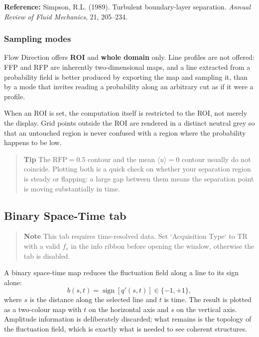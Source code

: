 \noindent\textbf{Reference:} Simpson, R.L. (1989). Turbulent boundary-layer separation. \textit{Annual Review of Fluid Mechanics}, 21, 205--234.

\subsubsection*{Sampling modes}

Flow Direction offers \textbf{ROI} and \textbf{whole domain} only. Line profiles are not offered: FFP and RFP are inherently two-dimensional maps, and a line extracted from a probability field is better produced by exporting the map and sampling it, than by a mode that invites reading a probability along an arbitrary cut as if it were a profile.

When an ROI is set, the computation itself is restricted to the ROI, not merely the display. Grid points outside the ROI are rendered in a distinct neutral grey so that an untouched region is never confused with a region where the probability happens to be low.

\begin{quote}
\textbf{Tip}
The $\mathrm{RFP} = 0.5$ contour and the mean $\langle u \rangle = 0$ contour usually do not coincide. Plotting both is a quick check on whether your separation region is steady or flapping: a large gap between them means the separation point is moving substantially in time.
\end{quote}

\subsection{Binary Space-Time tab}

\begin{quote}
\textbf{Note}
This tab requires time-resolved data. Set `Acquisition Type` to TR with a valid $f_s$ in the info ribbon before opening the window, otherwise the tab is disabled.
\end{quote}

A binary space-time map reduces the fluctuation field along a line to its sign alone:
\[
b(s, t) = \operatorname{sign}\!\left[q'(s, t)\right] \in \{-1, +1\},
\]
where $s$ is the distance along the selected line and $t$ is time. The result is plotted as a two-colour map with $t$ on the horizontal axis and $s$ on the vertical axis. Amplitude information is deliberately discarded; what remains is the topology of the fluctuation field, which is exactly what is needed to see coherent structures.

